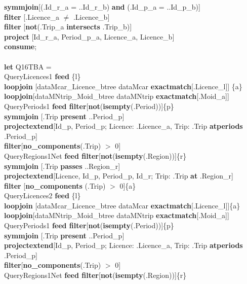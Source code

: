 \documentclass[a4paper]{article}
\newcommand{\op}[1]{\textbf{#1}}
\begin{document}
\begin{scriptsize}
\begin{tabbing}
\>\op{symmjoin}[(.Id\_r\_a = ..Id\_r\_b) \op{and} (.Id\_p\_a = ..Id\_p\_b)]\\
\>\op{filter} [.Licence\_a $\neq$ .Licence\_b]\\
\>\op{filter} [\op{not}(.Trip\_a \op{intersects} .Trip\_b)]\\
\>\op{project} [Id\_r\_a, Period\_p\_a, Licence\_a, Licence\_b]\\
\op{consume};\\
\\
\op{let} Q16TBA =\\
\>QueryLicences1 \op{feed} \{l\}\\
\>\>\>\op{loopjoin} [dataMcar\_Licence\_btree dataMcar
\op{exactmatch}[.Licence\_l]] \{a\}\\
\>\>\>\op{loopjoin}[dataMNtrip\_Moid\_btree dataMNtrip
\op{exactmatch}[.Moid\_a]]\\
\>\>QueryPeriods1 \op{feed filter}[\op{not}(\op{isempty}(.Period))]\{p\}\\
\>\>\op{symmjoin} [.Trip \op{present} ..Period\_p]\\
\>\>\>\op{projectextend}[Id\_p, Period\_p; Licence: .Licence\_a, Trip: .Trip
\op{atperiods} .Period\_p]\\
\>\>\>\op{filter}[\op{no\_components}(.Trip) $>$ 0]\\
\>\>QueryRegions1Net \op{feed filter}[\op{not}(\op{isempty}(.Region))]\{r\}\\
\>\>\op{symmjoin} [.Trip \op{passes} ..Region\_r]\\
\>\>\>\op{projectextend}[Licence, Id\_p, Period\_p, Id\_r; Trip: .Trip \op{at}
.Region\_r]\\
\>\>\>\op{filter} [\op{no\_components} (.Trip) $>$ 0]\{a\}\\
\>QueryLicences2 \op{feed} \{l\}\\
\>\>\>\op{loopjoin} [dataMcar\_Licence\_btree dataMcar
\op{exactmatch}[.Licence\_l]]\{a\}\\
\>\>\>\op{loopjoin}[dataMNtrip\_Moid\_btree dataMNtrip
\op{exactmatch}[.Moid\_a]]\\
\>\>QueryPeriods1 \op{feed filter}[\op{not}(\op{isempty}(.Period))]\{p\}\\
\>\>\op{symmjoin} [.Trip \op{present} ..Period\_p]\\
\>\>\>\op{projectextend}[Id\_p, Period\_p; Licence: .Licence\_a, Trip: .Trip
\op{atperiods} .Period\_p]\\
\>\>\>\op{filter}[\op{no\_components}(.Trip) $>$ 0]\\
\>\>QueryRegions1Net \op{feed filter}[\op{not}(\op{isempty}(.Region))]\{r\}\\

\end{tabbing}
\end{scriptsize}
\end{document}
